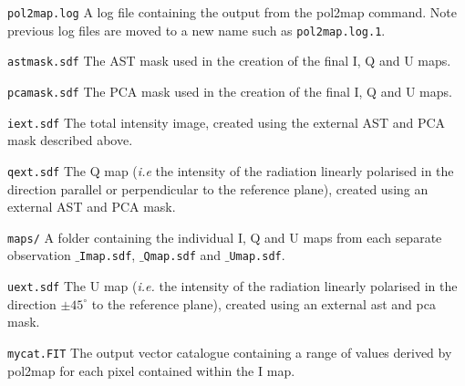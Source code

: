 \begin{aligndesc}
\item[\texttt{pol2map.log}] A log file containing the output from the
  pol2map command. Note previous log files are moved to a new name
  such as \texttt{pol2map.log.1}.

\item[\texttt{astmask.sdf}] The AST mask used in the creation
  of the final I, Q and U maps.

\item[\texttt{pcamask.sdf}] The PCA mask used in the creation of the
  final I, Q and U maps.

\item[\texttt{iext.sdf}] The total intensity image, created using the
  external AST and PCA mask described above.

\item[\texttt{qext.sdf}] The Q map (\emph{i.e} the intensity of the radiation
  linearly polarised in the direction parallel or perpendicular to the
  reference plane), created using an external AST and PCA mask.

\item[\texttt{maps/}] A folder containing the individual I, Q and U
  maps from each separate observation \texttt{$\_$Imap.sdf},
  \texttt{$\_$Qmap.sdf} and \texttt{$\_$Umap.sdf}.

\item[\texttt{uext.sdf}] The U map (\emph{i.e.} the intensity of the radiation
  linearly polarised in the direction $\pm45^{\circ }$ to the reference plane),
  created using an external ast and pca mask.

\item[\texttt{mycat.FIT}] The output vector catalogue containing a
  range of values derived by pol2map for each pixel contained within
  the I map.

\end{aligndesc}


